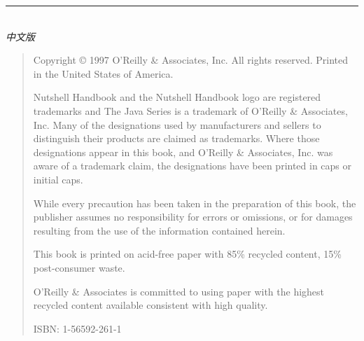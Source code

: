 \thispagestyle{empty}

\noindent
\begin{minipage}{\textwidth}
  \noindent\rule[-1ex]{\textwidth}{5pt}\\[2.5ex]
  \hfill\emph{\Large 中文版}
\end{minipage}

\noindent{}


\newpage\thispagestyle{empty}
\begin{quote}\footnotesize
  Copyright \copyright{} 1997 O'Reilly \& Associates, Inc. All rights reserved.
  Printed in the United States of America.

  Nutshell Handbook and the Nutshell Handbook logo are registered trademarks and The Java Series is a trademark of O'Reilly \& Associates, Inc. Many of the designations used by manufacturers and sellers to distinguish their products are claimed as trademarks. Where those designations appear in this book, and O'Reilly \& Associates, Inc. was aware of a trademark claim, the designations have been printed in caps or initial caps.

  While every precaution has been taken in the preparation of this book, the publisher assumes no responsibility for errors or omissions, or for damages resulting from the use of the information contained herein.

  This book is printed on acid-free paper with 85\% recycled content, 15\% post-consumer waste.

  O'Reilly \& Associates is committed to using paper with the highest recycled content available consistent with high quality.

  ISBN: 1-56592-261-1
\end{quote}

